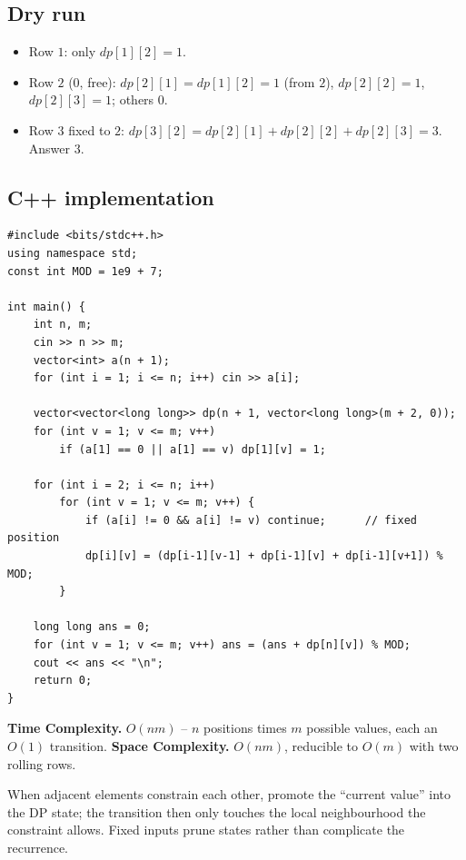 \subsection*{Dry run}


\begin{itemize}
  \item Row $1$: only $\textit{dp}[1][2]=1$.
  \item Row $2$ ($0$, free): $\textit{dp}[2][1]=\textit{dp}[1][2]=1$
        (from $2$), $\textit{dp}[2][2]=1$, $\textit{dp}[2][3]=1$; others
        $0$.
  \item Row $3$ fixed to $2$: $\textit{dp}[3][2]=\textit{dp}[2][1]+
        \textit{dp}[2][2]+\textit{dp}[2][3]=3$. Answer $3$.
\end{itemize}

\subsection*{C++ implementation}

\begin{lstlisting}
#include <bits/stdc++.h>
using namespace std;
const int MOD = 1e9 + 7;

int main() {
    int n, m;
    cin >> n >> m;
    vector<int> a(n + 1);
    for (int i = 1; i <= n; i++) cin >> a[i];

    vector<vector<long long>> dp(n + 1, vector<long long>(m + 2, 0));
    for (int v = 1; v <= m; v++)
        if (a[1] == 0 || a[1] == v) dp[1][v] = 1;

    for (int i = 2; i <= n; i++)
        for (int v = 1; v <= m; v++) {
            if (a[i] != 0 && a[i] != v) continue;      // fixed position
            dp[i][v] = (dp[i-1][v-1] + dp[i-1][v] + dp[i-1][v+1]) % MOD;
        }

    long long ans = 0;
    for (int v = 1; v <= m; v++) ans = (ans + dp[n][v]) % MOD;
    cout << ans << "\n";
    return 0;
}
\end{lstlisting}

\begin{complexitybox}
\textbf{Time Complexity.} $O(nm)$ -- $n$ positions times $m$ possible
values, each an $O(1)$ transition. \textbf{Space Complexity.} $O(nm)$,
reducible to $O(m)$ with two rolling rows.
\end{complexitybox}

\begin{takeawaybox}
When adjacent elements constrain each other, promote the ``current value''
into the DP state; the transition then only touches the local
neighbourhood the constraint allows. Fixed inputs prune states rather than
complicate the recurrence.
\end{takeawaybox}
